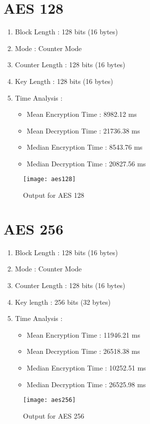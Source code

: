 \documentclass[11pt, pdftex]{article}
\begin{document}
\section{AES 128}
\begin{enumerate}
	\item Block Length : 128 bits (16 bytes)
	\item Mode : Counter Mode
	\item Counter Length : 128 bits (16 bytes)
	\item Key Length : 128 bits (16 bytes)
	\item Time Analysis : 
	\begin{itemize}
		\item Mean Encryption Time : 8982.12 ms
		\item Mean Decryption Time : 21736.38 ms
		\item Median Encryption Time : 8543.76 ms
		\item Median Decryption Time : 20827.56 ms
	\end{itemize}
\end{enumerate}
\begin{figure}[t]
	\caption{Output for AES 128}
	\centering
    \texttt{[image: aes128]}
\end{figure}


\section{AES 256}
\begin{enumerate}
	\item Block Length : 128 bits (16 bytes)
	\item Mode : Counter Mode
	\item Counter Length : 128 bits (16 bytes)
	\item Key length : 256 bits (32 bytes)
	\item Time Analysis : 
	\begin{itemize}
		\item Mean Encryption Time : 11946.21 ms
		\item Mean Decryption Time : 26518.38 ms
		\item Median Encryption Time : 10252.51 ms
		\item Median Decryption Time : 26525.98 ms
	\end{itemize}
\end{enumerate}
\newpage
\begin{figure}[t]
	\caption{Output for AES 256}
	\centering
	\texttt{[image: aes256]}
\end{figure}
\end{document}
